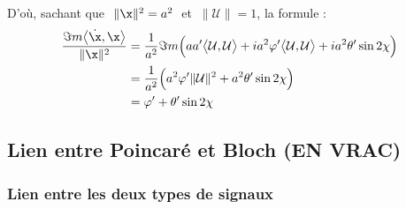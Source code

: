 \skipl

D'où, sachant que $\ \|\x\|^2=a^2\ $ et $\ \|\mathcal{U}\|=1$, la formule :
\begin{align*}
	\frac{\Im m\big\langle \dot{\x}, \x\big\rangle}{\|\x\|^2} &= \frac{1}{a^2}\Im m\Big(aa' \big\langle \mathcal{U}, \mathcal{U}\big\rangle  + ia^2\varphi' \big\langle \mathcal{U}, \mathcal{U}\big\rangle + ia^2\theta' \sin2\chi \Big) \\
	&= \frac{1}{a^2} \Big( a^2\varphi' \|\mathcal{U}\|^2 + a^2\theta' \sin2\chi \Big) \\
	&= \varphi' + \theta' \sin2\chi
\end{align*}
\skipl




\subsection{\todo Lien entre Poincaré et Bloch (EN VRAC)}




\subsubsection{\todo Lien entre les deux types de signaux}

